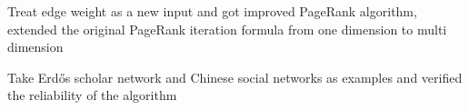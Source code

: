 \documentclass[letterpaper]{deedy-resume} %
\begin{document}
\begin{minipage}[t]{0.66\textwidth}
\descript{}

\vspace{\topsep} %
\begin{tightitemize}
	\item Treat edge weight as a new input and got improved PageRank algorithm, extended the original PageRank iteration formula from one dimension to multi dimension
	\item Take Erdős scholar network and Chinese social networks as examples and verified the reliability of the algorithm
\end{tightitemize}



%
%


%
%


\end{minipage}
\end{document}
